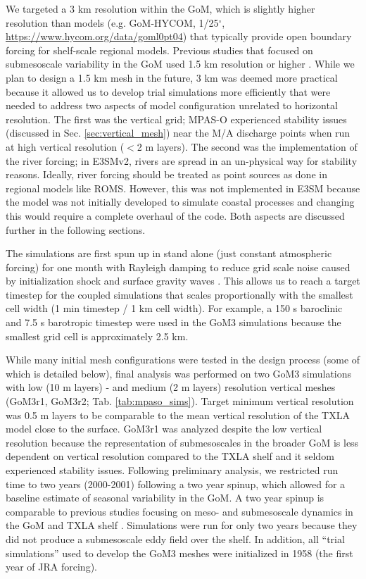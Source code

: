 We targeted a 3 km resolution within the GoM, which is slightly higher resolution than models (e.g. GoM-HYCOM, 1/25$^\circ$, \url{https://www.hycom.org/data/goml0pt04}) that typically provide open boundary forcing for shelf-scale regional models. Previous studies that focused on submesoscale variability in the GoM used 1.5 km resolution or higher \citep{barkan2017submesoscalepart2, bracco2019mesoscale, liu2021submesoscale}. While we plan to design a 1.5 km mesh in the future, 3 km was deemed more practical because it allowed us to develop trial simulations more efficiently that were needed to address two aspects of model configuration unrelated to horizontal resolution. The first was the vertical grid; MPAS-O experienced stability issues (discussed in Sec. \ref{sec:vertical_mesh}) near the M/A discharge points when run at high vertical resolution ($<$2 m layers). The second was the implementation of the river forcing; in E3SMv2, rivers are spread in an un-physical way for stability reasons. Ideally, river forcing should be treated as point sources as done in regional models like ROMS. However, this was not implemented in E3SM because the model was not initially developed to simulate coastal processes and changing this would require a complete overhaul of the code. Both aspects are discussed further in the following sections. 

The simulations are first spun up in stand alone (just constant atmospheric forcing) for one month with Rayleigh damping to reduce grid scale noise caused by initialization shock and surface gravity waves \citep{petersen2018mpas}. This allows us to reach a target timestep for the coupled simulations that scales proportionally with the smallest cell width (1 min timestep / 1 km cell width). For example, a 150 s baroclinic and 7.5 s barotropic timestep were used in the GoM3 simulations because the smallest grid cell is approximately 2.5 km.

While many initial mesh configurations were tested in the design process (some of which is detailed below), final analysis was performed on two GoM3 simulations with low (10 m layers) - and medium (2 m layers) resolution vertical meshes (GoM3r1, GoM3r2; Tab. \ref{tab:mpaso_sims}). Target minimum vertical resolution was 0.5 m layers to be comparable to the mean vertical resolution of the TXLA model close to the surface. GoM3r1 was analyzed despite the low vertical resolution because the representation of submesoscales in the broader GoM is less dependent on vertical resolution compared to the TXLA shelf and it seldom experienced stability issues. Following preliminary analysis, we restricted run time to two years (2000-2001) following a two year spinup, which allowed for a baseline estimate of seasonal variability in the GoM. A two year spinup is comparable to previous studies focusing on meso- and submesoscale dynamics in the GoM and TXLA shelf \citep{Barkan_2017, Kobashi_2020}. Simulations were run for only two years because they did not produce a submesoscale eddy field over the shelf.  In addition, all ``trial simulations'' used to develop the GoM3 meshes were initialized in 1958 (the first year of JRA forcing).

